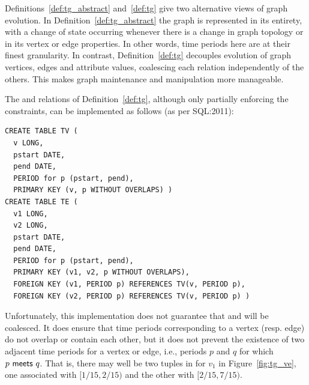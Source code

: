 Definitions~\ref{def:tg_abstract} and~\ref{def:tg} give two
alternative views of graph evolution.  In
Definition~\ref{def:tg_abstract} the graph is represented in its
entirety, with a change of state occurring whenever there is a change
in graph topology or in its vertex or edge properties.  In other
words, time periods here are at their finest granularity.  In
contrast, Definition~\ref{def:tg} decouples evolution of graph
vertices, edges and attribute values, coalescing each relation
independently of the others.  This makes graph maintenance and
manipulation more manageable.

The \tv and \te relations of Definition~\ref{def:tg}, although only
partially enforcing the constraints, can be implemented as follows (as
per SQL:2011):


\begin{scriptsize}
\begin{verbatim}
CREATE TABLE TV (
  v LONG,
  pstart DATE,
  pend DATE,
  PERIOD for p (pstart, pend),
  PRIMARY KEY (v, p WITHOUT OVERLAPS) )
CREATE TABLE TE (
  v1 LONG,
  v2 LONG,
  pstart DATE,
  pend DATE,
  PERIOD for p (pstart, pend),
  PRIMARY KEY (v1, v2, p WITHOUT OVERLAPS),
  FOREIGN KEY (v1, PERIOD p) REFERENCES TV(v, PERIOD p),
  FOREIGN KEY (v2, PERIOD p) REFERENCES TV(v, PERIOD p) )
\end{verbatim}
\vspace{-0.3cm}
\end{scriptsize}

Unfortunately, this implementation does not guarantee that \tv and \te
will be coalesced.  It does ensure that time periods corresponding to
a vertex (resp. edge) do not overlap or contain each other, but it
does not prevent the existence of two adjacent time periods for a
vertex or edge, i.e., periods $p$ and $q$ for which
$p~\mathsf{meets}~q$.  That is, there may well be two tuples in \tv
for $v_1$ in Figure~\ref{fig:tg_ve}, one associated with $[1/15,
  2/15)$ and the other with $[2/15, 7/15)$.

